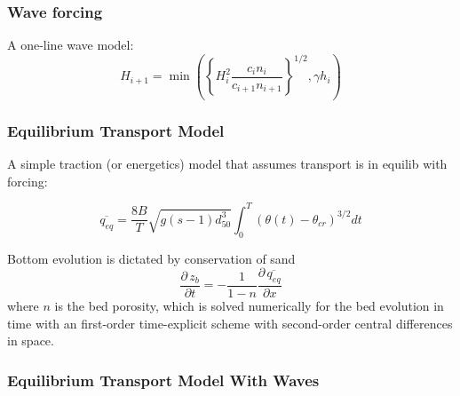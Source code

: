 \documentclass[aspectratio=169]{beamer}
\newcommand{\pdv}[2]{\frac{\partial \, #1}{\partial #2}}
\begin{document}
\begin{frame}
  \frametitle{Wave forcing}
  A one-line wave model:
  \begin{equation*}
    H_{i+1}=\min{\left(\left\{ H_i^2 \frac{c_i n_i}{c_{i+1} n_{i+1}}\right\}^{1/2},\gamma h_i\right)}
  \end{equation*}
  
    \centering
\end{frame}

\begin{frame}
\frametitle{Equilibrium Transport Model}
A simple traction (or energetics) model that assumes transport is in equilib with forcing: 

\begin{equation*}
  \overline{q_{eq}} = \frac{8 B}{T} \sqrt{g (s-1) d_{50}^3}\int_0^T(\theta(t)-\theta_{cr})^{3/2} dt 
\end{equation*}

Bottom evolution is dictated by conservation of sand
\begin{equation*}
\pdv{z_b}{t} = -\frac{1}{1-n} \pdv{\overline{q_{eq}}}{x}
\end{equation*}
where $n$ is the bed porosity, which is solved numerically for the bed
evolution in time with an first-order time-explicit scheme with
second-order central differences in space.
\end{frame}
\begin{frame}
  \frametitle{Equilibrium Transport Model With Waves} 
  \centering
\end{frame}
\end{document}
